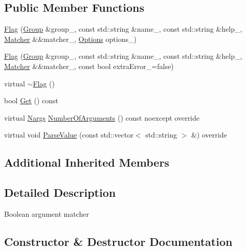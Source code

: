 \subsection*{Public Member Functions}
\begin{DoxyCompactItemize}
\item 
\hyperlink{classargs_1_1_flag_a49d467bbf32414fbf744f9e4a1326c4b}{Flag} (\hyperlink{classargs_1_1_group}{Group} \&group\+\_\+, const std\+::string \&name\+\_\+, const std\+::string \&help\+\_\+, \hyperlink{classargs_1_1_matcher}{Matcher} \&\&matcher\+\_\+, \hyperlink{namespaceargs_aa530c0f95194aa275f49a5f299ac9e77}{Options} options\+\_\+)
\item 
\hyperlink{classargs_1_1_flag_a42deec08baee60827d9576f56f54055c}{Flag} (\hyperlink{classargs_1_1_group}{Group} \&group\+\_\+, const std\+::string \&name\+\_\+, const std\+::string \&help\+\_\+, \hyperlink{classargs_1_1_matcher}{Matcher} \&\&matcher\+\_\+, const bool extra\+Error\+\_\+=false)
\item 
virtual \hyperlink{classargs_1_1_flag_a726b9a61e5165dd4ae1e2b67241dc761}{$\sim$\+Flag} ()
\item 
bool \hyperlink{classargs_1_1_flag_a5cdbec9617c6776ab2e3b67c0a72fd9a}{Get} () const
\item 
virtual \hyperlink{structargs_1_1_nargs}{Nargs} \hyperlink{classargs_1_1_flag_a1bd707628d2987d3ccf2dbdb810302e4}{Number\+Of\+Arguments} () const noexcept override
\item 
virtual void \hyperlink{classargs_1_1_flag_a48ce8c59b554db36d2869b24b56c94dd}{Parse\+Value} (const std\+::vector$<$ std\+::string $>$ \&) override
\end{DoxyCompactItemize}
\subsection*{Additional Inherited Members}


\subsection{Detailed Description}
Boolean argument matcher 

\subsection{Constructor \& Destructor Documentation}
\mbox{\label{classargs_1_1_flag_a49d467bbf32414fbf744f9e4a1326c4b}} 
